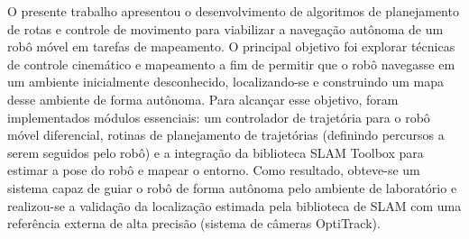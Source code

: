 \label{Cap05}











O presente trabalho apresentou o desenvolvimento de algoritmos de planejamento de rotas e controle de movimento para viabilizar a navegação autônoma de um robô móvel em tarefas de mapeamento. O principal objetivo foi explorar técnicas de controle cinemático e mapeamento a fim de permitir que o robô navegasse em um ambiente inicialmente desconhecido, localizando-se e construindo um mapa desse ambiente de forma autônoma. Para alcançar esse objetivo, foram implementados módulos essenciais: um controlador de trajetória para o robô móvel diferencial, rotinas de planejamento de trajetórias (definindo percursos a serem seguidos pelo robô) e a integração da biblioteca SLAM Toolbox para estimar a pose do robô e mapear o entorno. Como resultado, obteve-se um sistema capaz de guiar o robô de forma autônoma pelo ambiente de laboratório e realizou-se a validação da localização estimada pela biblioteca de SLAM com uma referência externa de alta precisão (sistema de câmeras OptiTrack).


